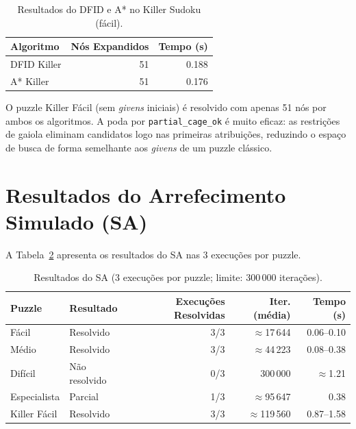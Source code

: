 \begin{table}[ht]
    \caption{Resultados do DFID e A* no Killer Sudoku (fácil).}
    \label{tab:prolog_killer}
    \centering
    \begin{tabular}{lrr}
        \toprule
        \textbf{Algoritmo} & \textbf{Nós Expandidos} & \textbf{Tempo (s)} \\
        \midrule
        DFID Killer & 51 & 0.188 \\
        A* Killer   & 51 & 0.176 \\
        \bottomrule
    \end{tabular}
\end{table}

O puzzle Killer Fácil (sem \emph{givens} iniciais) é resolvido com apenas 51 nós por ambos os algoritmos. A poda por \texttt{partial\_cage\_ok} é muito eficaz: as restrições de gaiola eliminam candidatos logo nas primeiras atribuições, reduzindo o espaço de busca de forma semelhante aos \emph{givens} de um puzzle clássico.

\section{Resultados do Arrefecimento Simulado (SA)}
\label{sec:resultados_sa}

A Tabela~\ref{tab:sa} apresenta os resultados do SA nas 3 execuções por puzzle.

\begin{table}[ht]
    \caption{Resultados do SA (3 execuções por puzzle; limite: 300\,000 iterações).}
    \label{tab:sa}
    \centering
    \begin{tabular}{llrrr}
        \toprule
        \textbf{Puzzle} & \textbf{Resultado} & \textbf{Execuções Resolvidas} & \textbf{Iter. (média)} & \textbf{Tempo (s)} \\
        \midrule
        Fácil       & Resolvido   & 3/3 & $\approx$17\,644 & 0.06--0.10 \\
        Médio       & Resolvido   & 3/3 & $\approx$44\,223 & 0.08--0.38 \\
        Difícil     & Não resolvido & 0/3 & 300\,000 & $\approx$1.21 \\
        Especialista & Parcial    & 1/3 & $\approx$95\,647 & 0.38 \\
        Killer Fácil & Resolvido  & 3/3 & $\approx$119\,560 & 0.87--1.58 \\
        \bottomrule
    \end{tabular}
\end{table}

